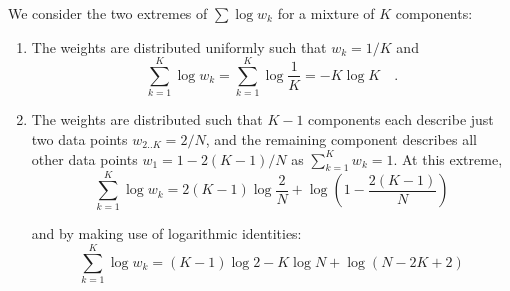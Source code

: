 \documentclass{elsarticle}
\def\weight{w}
\begin{document}
We consider the two extremes of $\sum\log\weight_k$ for a mixture of $K$ components:
\begin{enumerate}
    \item The weights are distributed uniformly such that $w_k = 1/K$ and
          \begin{equation}
                \sum_{k=1}^{K}\log\weight_k = \sum_{k=1}^{K}\log{\frac{1}{K}} =-K\log{K} \quad .
          \end{equation}
    \item The weights are distributed such that $K - 1$ components each 
          describe just two data points $w_{2..K} = 2/N$, and the remaining 
          component describes all other data points $w_{1} = 1 - 2(K-1)/N$
          as $\sum_{k=1}^{K}\weight_k = 1$. At this extreme,
          \begin{equation}
                \sum_{k=1}^{K}\log\weight_k = 2(K-1)\log\frac{2}{N} 
                		    + \log\left(1 - \frac{2(K - 1)}{N}\right)
		    \label{eq:slw_uniform}
          \end{equation}

          \noindent{}and by making use of logarithmic identities:
          \begin{equation}
            \sum_{k=1}^{K}\log\weight_k = (K - 1)\log{2} - K\log{N} + \log{(N - 2K + 2)}
          \end{equation}

\end{enumerate}
\end{document}
